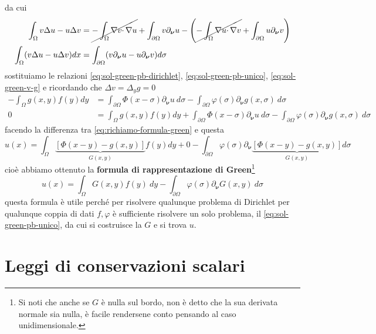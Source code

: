 \documentclass[10pt,a4paper,twoside,openright]{book}
\begin{document}
da cui
\begin{align*}
	\int _{\Omega } v\Delta u-u\Delta v      & =\cancel{-\int _{\Omega } \nabla v\cdotp \nabla u} +\int _{\partial \Omega } v\partial _{\bm{\nu}} u-\left(\cancel{-\int _{\Omega } \nabla u\cdotp \nabla v} +\int _{\partial \Omega } u\partial _{\bm{\nu}} v\right) \\
	\int _{\Omega }( v\Delta u-u\Delta v) dx & =\int _{\partial \Omega }( v\partial _{\bm{\nu}} u-u\partial _{\bm{\nu}} v) d\sigma                                                                                                                                 
\end{align*}
sostituiamo le relazioni \eqref{eq:sol-green-pb-dirichlet}, \eqref{eq:sol-green-pb-unico}, \eqref{eq:sol-green-v-g} e ricordando che $\Delta v=\Delta _{y} g=0$
\begin{align*}
	-\int _{\Omega } g( x,y) f( y) dy & =\int _{\partial \Omega } \Phi ( x-\sigma ) \partial _{\bm{\nu}} u\ d\sigma -\int _{\partial \Omega } \varphi ( \sigma ) \partial _{\bm{\nu}} g( x,\sigma ) \ d\sigma                                  \\
	0                                 & =\int _{\Omega } g( x,y) f( y) dy+\int _{\partial \Omega } \Phi ( x-\sigma ) \partial _{\bm{\nu}} u\ d\sigma -\int _{\partial \Omega } \varphi ( \sigma ) \partial _{\bm{\nu}} g( x,\sigma ) \ d\sigma 
\end{align*}
facendo la differenza tra \eqref{eq:richiamo-formula-green} e questa
\begin{equation*}
	u( x) =\int _{\Omega }\underbrace{[ \Phi ( x-y) -g( x,y)]}_{G( x,y)} f( y) dy+0-\int _{\partial \Omega } \varphi ( \sigma ) \partial _{\bm{\nu}}\underbrace{[ \Phi ( x-y) -g( x,y)]}_{G( x,y)} d\sigma 
\end{equation*}
cioè abbiamo ottenuto la \textbf{formula di rappresentazione di Green}\footnote{Si noti che anche se $G$ è nulla sul bordo, non è detto che la sua derivata normale sia nulla, è facile rendersene conto pensando al caso unidimensionale.}
\begin{equation*}
	\boxed{u( x) =\int _{\Omega } G( x,y) f( y) \ dy-\int _{\partial \Omega } \varphi ( \sigma ) \partial _{\bm{\nu}} G( x,y) \ d\sigma }
\end{equation*}
questa formula è utile perché per risolvere qualunque problema di Dirichlet per qualunque coppia di dati $f,\varphi $ è sufficiente risolvere un solo problema, il \eqref{eq:sol-green-pb-unico}, da cui si costruisce la $G$ e si trova $u$.
\chapter{Leggi di conservazioni scalari}
\end{document}
